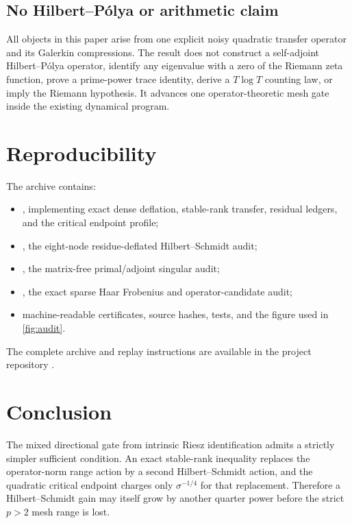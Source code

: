 \documentclass[11pt]{article}
\theoremstyle{definition}
\theoremstyle{remark}
\begin{document}
\subsection{No Hilbert--P\'olya or arithmetic claim}

All objects in this paper arise from one explicit noisy quadratic transfer
operator and its Galerkin compressions.  The result does not construct a
self-adjoint Hilbert--P\'olya operator, identify any eigenvalue with a zero of
the Riemann zeta function, prove a prime-power trace identity, derive a
\(T\log T\) counting law, or imply the Riemann hypothesis.  It advances one
operator-theoretic mesh gate inside the existing dynamical program.

\section{Reproducibility}
\label{sec:reproducibility}

The archive contains:

\begin{itemize}[leftmargin=2em]
 \item {}, implementing exact dense deflation,
 stable-rank transfer, residual ledgers, and the critical endpoint profile;
 \item {}, the
 eight-node residue-deflated Hilbert--Schmidt audit;
 \item {}, the
 matrix-free primal/adjoint singular audit;
 \item {}, the exact
 sparse Haar Frobenius and operator-candidate audit;
 \item machine-readable certificates, source hashes, tests, and the figure
 used in \cref{fig:audit}.
\end{itemize}

The complete archive and replay instructions are available in the project
repository \citep{WangDirectionalCode2026}.

\section{Conclusion}

The mixed directional gate from intrinsic Riesz identification admits a
strictly simpler sufficient condition.  An exact stable-rank inequality
replaces the operator-norm range action by a second Hilbert--Schmidt action,
and the quadratic critical endpoint charges only
\(\sigma^{-1/4}\) for that replacement.  Therefore a Hilbert--Schmidt gain
may itself grow by another quarter power before the strict \(p>2\) mesh range
is lost.
\end{document}
